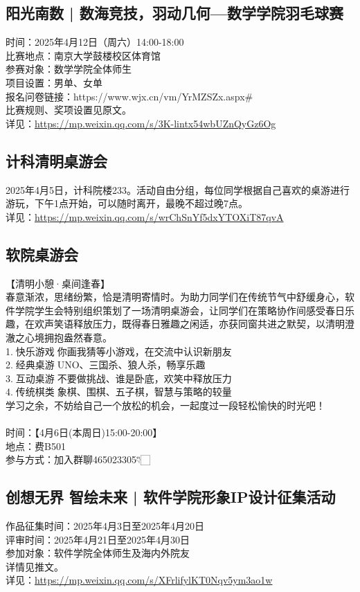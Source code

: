 \documentclass[letterpaper, 12pt]{article}
\begin{document}
\begin{multicols}{2}
\begin{tabular}{|>{\centering\arraybackslash}m{}|m{}|m{}|}
    \hline
\end{tabular}

\subsection{阳光南数 | 数海竞技，羽动几何—数学学院羽毛球赛}
时间：2025年4月12日（周六）14:00-18:00
\\比赛地点：南京大学鼓楼校区体育馆
\\参赛对象：数学学院全体师生
\\项目设置：男单、女单
\\报名问卷链接：https://www.wjx.cn/vm/YrMZSZx.aspx\# 
\\比赛规则、奖项设置见原文。
\\详见：\url{https://mp.weixin.qq.com/s/3K-lintx54wbUZnQyGz6Og}

\subsection{计科清明桌游会}
2025年4月5日，计科院楼233。活动自由分组，每位同学根据自己喜欢的桌游进行游玩，下午1点开始，可以随时离开，最晚不超过晚7点。
\\详见：\url{https://mp.weixin.qq.com/s/wrChSnYf5dxYTOXiT87qvA}

\subsection{软院桌游会}
【清明小憩·桌间逢春】
\\春意渐浓，思绪纷繁，恰是清明寄情时。为助力同学们在传统节气中舒缓身心，软件学院学生会特别组织策划了一场清明桌游会，让同学们在策略协作间感受春日乐趣，在欢声笑语释放压力，既得春日雅趣之闲适，亦获同窗共进之默契，以清明澄澈之心境拥抱盎然春意。
\\1.🎈快乐游戏🎈你画我猜等小游戏，在交流中认识新朋友
\\2.🎈经典桌游🎈UNO、三国杀、狼人杀，畅享乐趣
\\3.🎈互动桌游🎈不要做挑战、谁是卧底，欢笑中释放压力
\\4.🎈传统棋类🎈象棋、围棋、五子棋，智慧与策略的较量
\\学习之余，不妨给自己一个放松的机会，一起度过一段轻松愉快的时光吧！
\\
\\时间：【4月6日(本周日)15:00-20:00】
\\地点：费B501
\\参与方式：加入群聊465023305👇🏻


\subsection{创想无界 智绘未来 | 软件学院形象IP设计征集活动}
作品征集时间：2025年4月3日至2025年4月20日
\\评审时间：2025年4月21日至2025年4月30日
\\参加对象：软件学院全体师生及海内外院友
\\详情见推文。
\\详见：\url{https://mp.weixin.qq.com/s/XFrlifylKT0Nqv5ym3ao1w}


\end{multicols}
\end{document}
